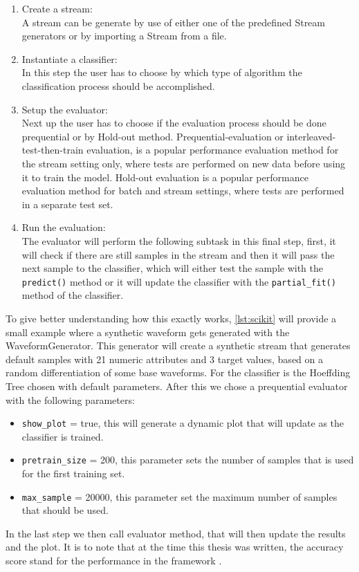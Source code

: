 \documentclass[12pt,oneside,a4paper,parskip]{scrbook}
\begin{document}
\begin{enumerate}
  \item Create a stream: \\
        A stream can be generate by use of either one of the predefined Stream generators or by importing a Stream from a file.
  \item Instantiate a classifier: \\
        In this step the user has to choose by which type of algorithm the classification process should be accomplished.
  \item Setup the evaluator: \\
        Next up the user has to choose if the evaluation process should be done prequential or by Hold-out method.
        Prequential-evaluation or interleaved-test-then-train evaluation, is a popular performance 
        evaluation method for the stream setting only, where tests are performed on new data before using it to train the model.
        Hold-out evaluation is a popular performance evaluation method for batch and stream settings, where tests are performed 
        in a separate test set. \cite{skmultiflow}
  \item Run the evaluation: \\
        The evaluator will perform the following subtask in this final step,
        first, it will check if there are still samples in the stream and then it will pass the next sample to the classifier,
        which will either test the sample with the \verb|predict()| method or it will update the classifier with the \verb|partial_fit()|
        method of the classifier.
\end{enumerate}
  
To give better understanding how this exactly works, \ref{lst:scikit} will provide a small example where a synthetic waveform gets 
generated with the WaveformGenerator. This generator will create a synthetic stream that generates default samples with
21 numeric attributes and 3 target values, based on a random differentiation of some base waveforms.
For the classifier is the Hoeffding Tree chosen with default parameters.
After this we chose a prequential evaluator with the following parameters: 
\begin{itemize}
  \item \verb|show_plot| = true, this will generate a dynamic plot that will update as the classifier is trained.
  \item \verb|pretrain_size| = 200, this parameter sets the number of samples that is used for the first training set.
  \item \verb|max_sample| = 20000, this parameter set the maximum number of samples that should be used.
\end{itemize}
In the last step we then call evaluator method, that will then update the results and the plot.
It is to note that at the time this thesis was written, the accuracy score stand for the performance 
in the framework \cite{skmultiflow}. 
\end{document}
